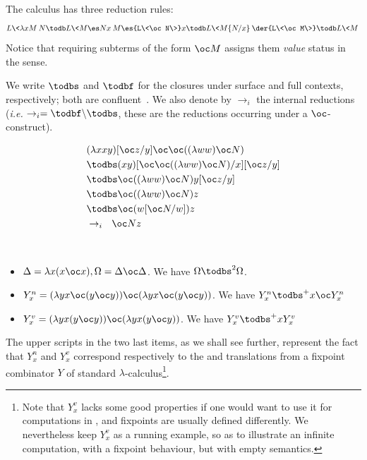 The \dbang{} calculus has three reduction rules: 
\[
L\<\lambda x M\>N \todb L\<M\es Nx\>
\hfill
M\es{L\<\oc N\>}x \todb L\<M\{N/x\}\>
\hfill
\der{L\<\oc M\>} \todb L\<M\>
\]
Notice that requiring subterms of the form $\oc M$ assigns them \emph{value} status in the \cbv{} sense.

We write $\todbs$ and $\todbf$ for the closures under surface and full contexts, respectively; both are confluent~\cite[Theorem 1]{kag24}.
We also denote by $\to_i$ the internal reductions (\emph{i.e.} $\to_i
= \todbf\backslash\todbs$, these are the reductions occurring under a
$\oc$-construct).	

\begin{example}
	\begin{align*}
	&(\lambda x xy)[\oc z/y]\oc\oc((\lambda ww)\oc N) \\
	&\todbs (xy)[\oc\oc((\lambda ww)\oc N)/x][\oc z/y] \\
	&\todbs \oc((\lambda ww)\oc N)y[\oc z/y] \\
	&\todbs \oc((\lambda ww)\oc N)z \\
	&\todbs \oc(w[\oc N/w])z \\
	&\to_i \ \ \oc Nz
	\end{align*}
\end{example}

\begin{example}~\label{ex:terms}
	\begin{itemize}
		\item $\Delta=\lambda x (x\oc x), \Omega =\Delta\oc\Delta$. We
			have $\Omega\todbs^2 \Omega$.
		\item $Y^n_x=(\lambda y x\oc(y\oc y))\oc (\lambda y x\oc(y\oc
			y))$. We have $Y^n_x\todbs^+ x\oc Y^n_x$
		\item $Y^v_x=(\lambda y x(y\oc y))\oc (\lambda y x(y\oc y))$. We
			have $Y^v_x\todbs^+x Y^v_x$
	\end{itemize}
	The upper scripts in the two last items, as we shall see further,
	represent the fact that $Y^n_x$ and $Y^v_x$ correspond respectively to
	the \cbn{} and \cbv{} translations from a fixpoint combinator $Y$ of standard
	$\lambda$-calculus\footnote{
		Note that $Y^v_x$ lacks some good properties if one would want to use it for
		computations in \cbv{}, and \cbv{} fixpoints are usually defined differently. We
		nevertheless keep $Y^v_x$ as a running example, so as to illustrate an
		infinite computation, with a fixpoint behaviour, but with empty semantics.
	}.
\end{example}


